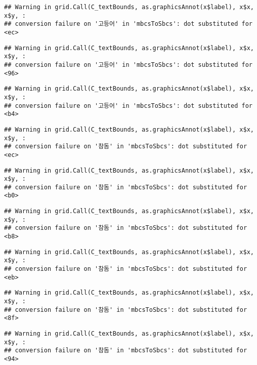 \documentclass[
]{article}
\begin{document}
\begin{verbatim}
## Warning in grid.Call(C_textBounds, as.graphicsAnnot(x$label), x$x, x$y, :
## conversion failure on '고등어' in 'mbcsToSbcs': dot substituted for <ec>
\end{verbatim}

\begin{verbatim}
## Warning in grid.Call(C_textBounds, as.graphicsAnnot(x$label), x$x, x$y, :
## conversion failure on '고등어' in 'mbcsToSbcs': dot substituted for <96>
\end{verbatim}

\begin{verbatim}
## Warning in grid.Call(C_textBounds, as.graphicsAnnot(x$label), x$x, x$y, :
## conversion failure on '고등어' in 'mbcsToSbcs': dot substituted for <b4>
\end{verbatim}

\begin{verbatim}
## Warning in grid.Call(C_textBounds, as.graphicsAnnot(x$label), x$x, x$y, :
## conversion failure on '참돔' in 'mbcsToSbcs': dot substituted for <ec>
\end{verbatim}

\begin{verbatim}
## Warning in grid.Call(C_textBounds, as.graphicsAnnot(x$label), x$x, x$y, :
## conversion failure on '참돔' in 'mbcsToSbcs': dot substituted for <b0>
\end{verbatim}

\begin{verbatim}
## Warning in grid.Call(C_textBounds, as.graphicsAnnot(x$label), x$x, x$y, :
## conversion failure on '참돔' in 'mbcsToSbcs': dot substituted for <b8>
\end{verbatim}

\begin{verbatim}
## Warning in grid.Call(C_textBounds, as.graphicsAnnot(x$label), x$x, x$y, :
## conversion failure on '참돔' in 'mbcsToSbcs': dot substituted for <eb>
\end{verbatim}

\begin{verbatim}
## Warning in grid.Call(C_textBounds, as.graphicsAnnot(x$label), x$x, x$y, :
## conversion failure on '참돔' in 'mbcsToSbcs': dot substituted for <8f>
\end{verbatim}

\begin{verbatim}
## Warning in grid.Call(C_textBounds, as.graphicsAnnot(x$label), x$x, x$y, :
## conversion failure on '참돔' in 'mbcsToSbcs': dot substituted for <94>
\end{verbatim}
\end{document}

